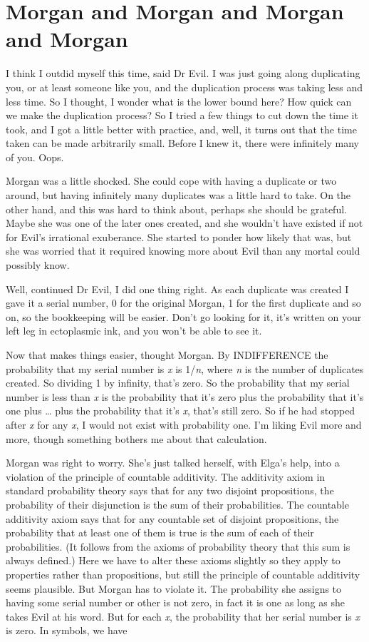 \section{Morgan and Morgan and Morgan and Morgan}

I think I outdid myself this time, said Dr Evil. I was just going along duplicating you, or at least someone like you, and the duplication process was taking less and less time. So I thought, I wonder what is the lower bound here? How quick can we make the duplication process? So I tried a few things to cut down the time it took, and I got a little better with practice, and, well, it turns out that the time taken can be made arbitrarily small. Before I knew it, there were infinitely many of you. Oops.

Morgan was a little shocked. She could cope with having a duplicate or two around, but having infinitely many duplicates was a little hard to take. On the other hand, and this was hard to think about, perhaps she should be grateful. Maybe she was one of the later ones created, and she wouldn't have existed if not for Evil's irrational exuberance. She started to ponder how likely that was, but she was worried that it required knowing more about Evil than any mortal could possibly know.

Well, continued Dr Evil, I did one thing right. As each duplicate was created I gave it a serial number, 0 for the original Morgan, 1 for the first duplicate and so on, so the bookkeeping will be easier. Don't go looking for it, it's written on your left leg in ectoplasmic ink, and you won't be able to see it.

Now that makes things easier, thought Morgan. By INDIFFERENCE the probability that my serial number is \textit{x} is 1/\textit{n}, where \textit{n} is the number of duplicates created. So dividing 1 by infinity, that's zero. So the probability that my serial number is less than \textit{x} is the probability that it's zero plus the probability that it's one plus {\dots} plus the probability that it's \textit{x}, that's still zero. So if he had stopped after \textit{x} for any \textit{x}, I would not exist with probability one. I'm liking Evil more and more, though something bothers me about that calculation.

Morgan was right to worry. She's just talked herself, with Elga's help, into a violation of the principle of countable additivity. The additivity axiom in standard probability theory says that for any two disjoint propositions, the probability of their disjunction is the sum of their probabilities. The countable additivity axiom says that for any countable set of disjoint propositions, the probability that at least one of them is true is the sum of each of their probabilities. (It follows from the axioms of probability theory that this sum is always defined.) Here we have to alter these axioms slightly so they apply to properties rather than propositions, but still the principle of countable additivity seems plausible. But Morgan has to violate it. The probability she assigns to having some serial number or other is not zero, in fact it is one as long as she takes Evil at his word. But for each \textit{x}, the probability that her serial number is \textit{x} is zero. In symbols, we have

